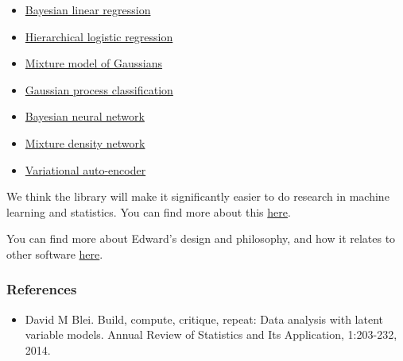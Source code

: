 \begin{itemize}
\tightlist
\item
  \href{https://github.com/blei-lab/edward/blob/master/examples/bayesian_linear_regression.py}{Bayesian
  linear regression}
\item
  \href{https://github.com/blei-lab/edward/blob/master/examples/hierarchical_logistic_regression.py}{Hierarchical
  logistic regression}
\item
  \href{https://github.com/blei-lab/edward/blob/master/examples/mixture_gaussian.py}{Mixture
  model of Gaussians}
\item
  \href{https://github.com/blei-lab/edward/blob/master/examples/gp_classification.py}{Gaussian
  process classification}
\item
  \href{https://github.com/blei-lab/edward/blob/master/examples/bayesian_nn.py}{Bayesian
  neural network}
\item
  \href{https://github.com/blei-lab/edward/blob/master/examples/mixture_density_network.py}{Mixture
  density network}
\item
  \href{https://github.com/blei-lab/edward/blob/master/examples/convolutional_vae.py}{Variational
  auto-encoder}
\end{itemize}

We think the library will make it significantly easier to do research in
machine learning and statistics. You can find more about this
\href{guide-research.md}{here}.

You can find more about Edward's design and philosophy, and how it
relates to other software \href{design.md}{here}.

\subsubsection{References}\label{references}

\begin{itemize}
\tightlist
\item
  David M Blei. Build, compute, critique, repeat: Data analysis with
  latent variable models. Annual Review of Statistics and Its
  Application, 1:203-232, 2014.
\end{itemize}
